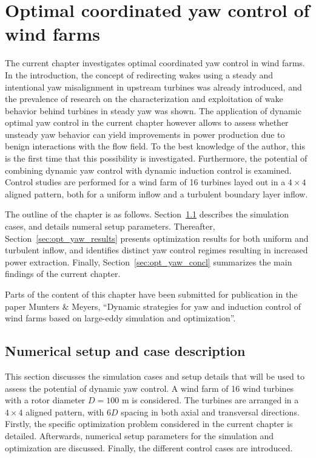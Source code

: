 \chapter{Optimal coordinated yaw control of wind farms}\label{ch:opt_yaw}

\def\mystrut{\rule{0pt}{1.1\normalbaselineskip}}

The current chapter investigates optimal coordinated yaw control in wind farms. In the introduction, the concept of redirecting wakes using a steady and intentional yaw misalignment in upstream turbines was already introduced, and the prevalence of research on the characterization and exploitation of wake behavior behind turbines in steady yaw was shown. The application of dynamic optimal yaw control in the current chapter however allows to assess whether unsteady yaw behavior can yield improvements in power production due to benign interactions with the flow field. To the best knowledge of the author, this is the first time that this possibility is investigated. Furthermore, the potential of combining dynamic yaw control with dynamic induction control is examined. Control studies are performed for a wind farm of 16 turbines layed out in a $4 \times 4$ aligned pattern, both for a uniform inflow and a turbulent boundary layer inflow. 

The outline of the chapter is as follows. Section~\ref{sec:opt_yaw_setup} describes the simulation cases, and details numeral setup parameters. Thereafter, Section~\ref{sec:opt_yaw_results} presents optimization results for both uniform and turbulent inflow, and identifies distinct yaw control regimes resulting in increased power extraction. Finally, Section~\ref{sec:opt_yaw_concl} summarizes the main findings of the current chapter. 

Parts of the content of this chapter have been submitted for publication in the paper Munters \& Meyers, ``Dynamic strategies for yaw and induction control of wind farms based on large-eddy simulation and optimization''.


\section{Numerical setup and case description}\label{sec:opt_yaw_setup}
This section discusses the simulation cases and setup details that will be used to assess the potential of dynamic yaw control. A wind farm of 16 wind turbines with a rotor diameter $D = 100$ m is considered. The turbines are arranged in a $4 \times 4$ aligned pattern, with $6D$ spacing in both axial and transversal directions. Firstly, the specific optimization problem considered in the current chapter is detailed. Afterwards, numerical setup parameters for the simulation and optimization are discussed. Finally, the different control cases are introduced. 

